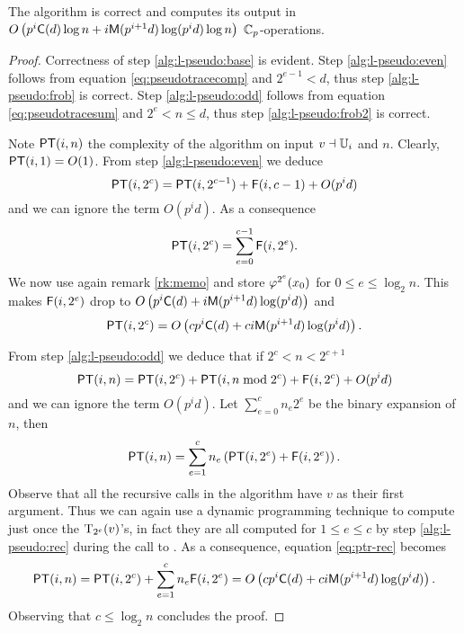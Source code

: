 \sloppy
\begin{theorem}
  \label{th:l-pseudo}
  The algorithm  is correct and computes its
  output in $O\left(p^i\mathrm{\sf C}(d)\log n +
  i\mathrm{\sf M}(p^{i+1}d)\log(p^id)\log n\right)$ $\mathbb{C}_p$-operations.
\end{theorem}
\fussy
\begin{proof}
  Correctness of step \ref{alg:l-pseudo:base} is evident. Step
  \ref{alg:l-pseudo:even} follows from equation
  \eqref{eq:pseudotracecomp} and $2^{e-1}<d$, thus step
  \ref{alg:l-pseudo:frob} is correct. Step \ref{alg:l-pseudo:odd}
  follows from equation \eqref{eq:pseudotracesum} and $2^e<n\le d$,
  thus step \ref{alg:l-pseudo:frob2} is correct.

  Note $\mathrm{\sf PT}(i,n)$ the complexity of the algorithm on input
  $v\dashv\mathbb{U}_i$ and $n$. Clearly, $\mathrm{\sf PT}(i,1)=O(1)$. From step
  \ref{alg:l-pseudo:even} we deduce
  \[\mathrm{\sf PT}(i,2^c) = \mathrm{\sf PT}(i,2^{c-1}) + \mathrm{\sf F}(i,c-1) + O(p^id)\]
  and we can ignore the term $O(p^id)$. As a consequence
  \begin{equation*}
    \mathrm{\sf PT}(i,2^c) = \sum_{e=0}^{c-1} \mathrm{\sf F}(i,2^e)\text{.}
  \end{equation*}
  We now use again remark \ref{rk:memo} and store $\varphi^{2^e}(x_0)$
  for $0\le e\le\log_2n$. This makes $\mathrm{\sf F}(i,2^e)$ drop to
  $O\left(p^i\mathrm{\sf C}(d) + i\mathrm{\sf M}(p^{i+1}d)\log(p^id)\right)$ and
  \begin{equation*}
    \mathrm{\sf PT}(i,2^c) = O\left(cp^i\mathrm{\sf C}(d) +
    ci\mathrm{\sf M}(p^{i+1}d)\log(p^id)\right) \text{.}
  \end{equation*}

  From step \ref{alg:l-pseudo:odd} we deduce that if $2^c<n<2^{c+1}$
  \begin{equation*}
    \mathrm{\sf PT}(i,n) =
    \mathrm{\sf PT}(i, 2^c) + \mathrm{\sf PT}(i, n\bmod 2^c) + \mathrm{\sf F}(i, 2^c) + O(p^id)
  \end{equation*}
  and we can ignore the term $O(p^id)$. Let $\sum_{e=0}^cn_e2^e$ be
  the binary expansion of $n$, then
  \begin{equation}
    \label{eq:ptr-rec}
    \mathrm{\sf PT}(i,n) = \sum_{e=1}^c n_e\left(\mathrm{\sf PT}(i, 2^e) + \mathrm{\sf F}(i,2^e)\right)
    \text{.}
  \end{equation}
  Observe that all the recursive calls in the algorithm have $v$ as
  their first argument. Thus we can again use a dynamic programming
  technique to compute just once the $\operatorname{T}_{2^e}(v)$'s, in fact they
  are all computed for $1\le e \le c$ by step \ref{alg:l-pseudo:rec}
  during the call to . As a
  consequence, equation \eqref{eq:ptr-rec} becomes
  \begin{equation*}
    \mathrm{\sf PT}(i,n) = \mathrm{\sf PT}(i, 2^c) + \sum_{e=1}^c n_e\mathrm{\sf F}(i,2^e) =
    O\left(cp^i\mathrm{\sf C}(d) + ci\mathrm{\sf M}(p^{i+1}d)\log(p^id)\right)
    \text{.}
  \end{equation*}
  Observing that $c\le\log_2n$ concludes the proof.
\end{proof}

